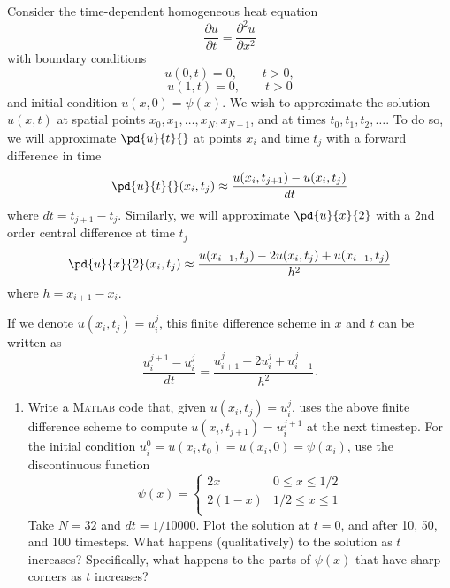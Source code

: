 Consider the time-dependent homogeneous heat equation 
\[
\frac{\partial u}{\partial t } = \frac{\partial^2 u}{\partial x^2 }
\] 
with boundary conditions
\[
u(0,t)= 0, \qquad t>0,
\] 
\[
u(1,t)= 0, \qquad t>0
\] 
and initial condition $u(x,0) = \psi(x)$.  We wish to approximate the solution $u(x,t)$ at spatial points $x_0, x_1, \ldots, x_{N}, x_{N+1}$, and at times $t_0, t_1, t_2, \ldots$.  To do so, we will approximate $\pd{u}{t}{}$ at points $x_i$ and time $t_j$ with a forward difference in time
\[
\pd{u}{t}{}(x_i,t_j) \approx \frac{u(x_i,t_{j+1}) - u(x_i,t_j)}{dt}
\]
where $dt = t_{j+1}-t_j$.  Similarly, we will approximate $\pd{u}{x}{2}$ with a 2nd order central difference at time $t_j$
\[
\pd{u}{x}{2}(x_i,t_j) \approx \frac{u(x_{i+1},t_j) - 2u(x_i,t_j) + u(x_{i-1},t_j)}{h^2}
\]
where $h = x_{i+1}-x_i$.  

If we denote $u(x_i, t_j) = u_i^j$, this finite difference scheme in $x$ and $t$ can be written as
\[
\frac{u^{j+1}_i - u^j_i}{dt} = \frac{u_{i+1}^j - 2u_i^j + u_{i-1}^j}{h^2}.
\]

\begin{enumerate}
\item Write a \textsc{Matlab} code that, given $u(x_i,t_j) = u^j_i$, uses the above finite difference scheme to compute $u(x_i,t_{j+1})= u^{j+1}_i$ at the next timestep.  For the initial condition $u_i^0 = u(x_i,t_0) =u(x_i,0)= \psi(x_i)$, use the discontinuous function 
\[  
\psi(x) = \left\{
\begin{array}{ll}
      2x & 0\leq x\leq 1/2 \\
      2(1-x) & 1/2 \leq x\leq 1 \\
\end{array} 
\right.
\]
Take $N = 32$ and $dt = 1/10000$.  Plot the solution at $t = 0$, and after 10, 50, and 100 timesteps.  What happens (qualitatively) to the solution as $t$ increases?  Specifically, what happens to the parts of $\psi(x)$ that have sharp corners as $t$ increases?  
\end{enumerate}



